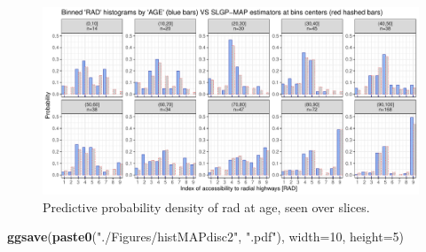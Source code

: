 \documentclass[
]{article}
\newenvironment{Shaded}{\begin{snugshade}}{\end{snugshade}}
\newcommand{\AttributeTok}[1]{\textcolor[rgb]{0.13,0.29,0.53}{#1}}
\newcommand{\DecValTok}[1]{\textcolor[rgb]{0.00,0.00,0.81}{#1}}
\newcommand{\FunctionTok}[1]{\textcolor[rgb]{0.13,0.29,0.53}{\textbf{#1}}}
\newcommand{\NormalTok}[1]{#1}
\newcommand{\StringTok}[1]{\textcolor[rgb]{0.31,0.60,0.02}{#1}}
\begin{document}
\begin{figure}[H]

{\centering \includegraphics{IntroductionSLGP_files/figure-latex/SLGPplottingdisc2-1} 

}

\caption{Predictive probability density of rad at age, seen over slices.}\label{fig:SLGPplottingdisc2}
\end{figure}

\begin{Shaded}
\begin{Highlighting}[]
\FunctionTok{ggsave}\NormalTok{(}\FunctionTok{paste0}\NormalTok{(}\StringTok{"./Figures/histMAPdisc2"}\NormalTok{,  }\StringTok{".pdf"}\NormalTok{), }\AttributeTok{width=}\DecValTok{10}\NormalTok{, }\AttributeTok{height=}\DecValTok{5}\NormalTok{)}
\end{Highlighting}
\end{Shaded}


  
\end{document}
